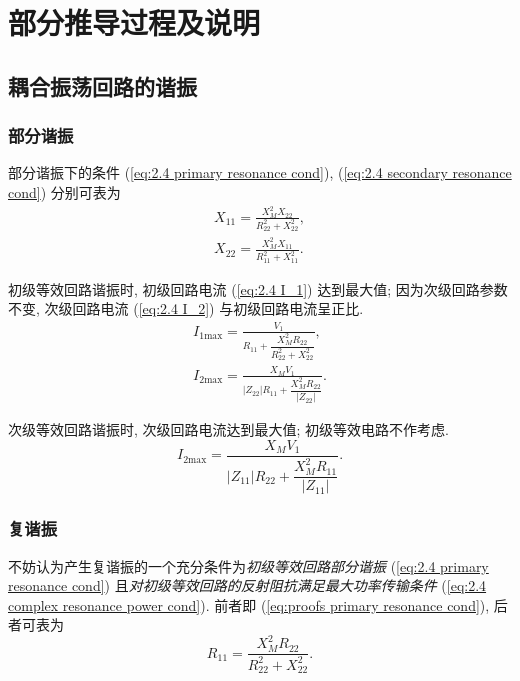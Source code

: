 \section{部分推导过程及说明} \label{部分推导过程及说明}

\subsection{耦合振荡回路的谐振}

\subsubsection{部分谐振}

部分谐振下的条件 (\ref{eq:2.4 primary resonance cond}), (\ref{eq:2.4 secondary resonance cond}) 分别可表为
\begin{gather}
    X_{11}=\frac{X_M^2X_{22}}{R_{22}^2+X_{22}^2}, \label{eq:proofs primary resonance cond} \\
    X_{22}=\frac{X_M^2X_{11}}{R_{11}^2+X_{11}^2}. \label{eq:proofs secondary resonance cond}
\end{gather}

初级等效回路谐振时, 初级回路电流 (\ref{eq:2.4 I_1}) 达到最大值; 因为次级回路参数不变, 次级回路电流 (\ref{eq:2.4 I_2}) 与初级回路电流呈正比.
\begin{gather}
    I_{1\mathrm{max}}=\frac{V_1}{R_{11}+\dfrac{X_M^2R_{22}}{R_{22}^2+X_{22}^2}}, \\
    I_{2\mathrm{max}}=\frac{X_MV_1}{|Z_{22}|R_{11}+\dfrac{X_M^2R_{22}}{|Z_{22}|}}. \label{eq:proofs primary resonance I_2max}
\end{gather}

次级等效回路谐振时, 次级回路电流达到最大值; 初级等效电路不作考虑.
\begin{equation}
    I_{2\mathrm{max}}=\frac{X_MV_1}{|Z_{11}|R_{22}+\dfrac{X_M^2R_{11}}{|Z_{11}|}}.
\end{equation}

\subsubsection{复谐振}

不妨认为产生复谐振的一个充分条件为\textit{初级等效回路部分谐振} (\ref{eq:2.4 primary resonance cond}) 且\textit{对初级等效回路的反射阻抗满足最大功率传输条件} (\ref{eq:2.4 complex resonance power cond}). 前者即 (\ref{eq:proofs primary resonance cond}), 后者可表为
\begin{equation} \label{eq:proofs complex resonance power cond}
    R_{11}=\frac{X_M^2R_{22}}{R_{22}^2+X_{22}^2}.
\end{equation}

